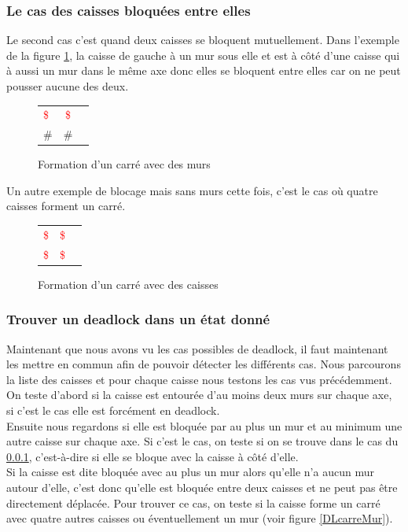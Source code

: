 \documentclass[a4paper,12pt]{article} %
\begin{document}
\subsubsection{Le cas des caisses bloquées entre elles}
\label{cBetween}

Le second cas c'est quand deux caisses se bloquent mutuellement. Dans l'exemple de la figure \ref{DL2}, la caisse de gauche à un mur sous elle et est à côté d'une caisse qui à aussi un mur dans le même axe donc elles se bloquent entre elles car on ne peut pousser aucune des deux.

\begin{figure}[!h]
\centering
\begin{tabular}{ l c r }
\textcolor{red}{\$} & \textcolor{red}{\$} \\
\#                  &     \#              \\
\end{tabular}
\caption{Formation d'un carré avec des murs}
\label{DL2}
\end{figure}

Un autre exemple de blocage mais sans murs cette fois, c'est le cas où quatre caisses forment un carré.

\begin{figure}[!h]
\centering
\begin{tabular}{ l c r }
\textcolor{red}{\$} & \textcolor{red}{\$} \\
\textcolor{red}{\$} & \textcolor{red}{\$} \\
\end{tabular}
\caption{Formation d'un carré avec des caisses}
\end{figure}

\subsubsection{Trouver un deadlock dans un état donné}

Maintenant que nous avons vu les cas possibles de deadlock, il faut maintenant les mettre en commun afin de pouvoir détecter les différents cas. Nous parcourons la liste des caisses et pour chaque caisse nous testons les cas vus précédemment. On teste d'abord si la caisse est entourée d'au moins deux murs sur chaque axe, si c'est le cas elle est forcément en deadlock.\\
Ensuite nous regardons si elle est bloquée par au plus un mur et au minimum une autre caisse sur chaque axe. Si c'est le cas, on teste si on se trouve dans le cas du \ref{cBetween}, c'est-à-dire si elle se bloque avec la caisse à côté d'elle.\\
Si la caisse est dite bloquée avec au plus un mur alors qu'elle n'a aucun mur autour d'elle, c'est donc qu'elle est bloquée entre deux caisses et ne peut pas être directement déplacée. Pour trouver ce cas, on teste si la caisse forme un carré avec quatre autres caisses ou éventuellement un mur (voir figure \ref{DLcarreMur}).
\end{document}
